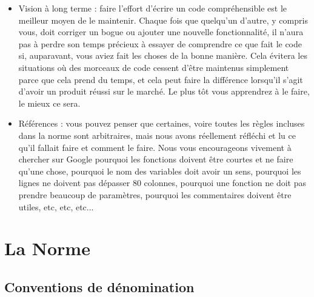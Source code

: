 \documentclass{42-fr}
\begin{document}
\begin{itemize}
    \item Vision à long terme : faire l'effort d'écrire un code compréhensible est le meilleur moyen de le maintenir. 
    Chaque fois que quelqu'un d'autre, y compris vous, doit corriger un bogue ou ajouter une nouvelle fonctionnalité, il n'aura pas à perdre son temps précieux à essayer de comprendre ce que fait le code si, auparavant, vous aviez fait les choses de la bonne manière. Cela évitera les situations où des morceaux de code cessent d'être maintenus simplement parce que cela prend du temps, et cela peut faire la différence lorsqu'il s'agit d'avoir un produit réussi sur le marché. 
    Le plus tôt vous apprendrez à le faire, le mieux ce sera.

    \item Références : vous pouvez penser que certaines, voire toutes les règles incluses dans la norme sont arbitraires, 
    mais nous avons réellement réfléchi et lu ce qu'il fallait faire et comment le faire.
    Nous vous encourageons vivement à chercher sur Google pourquoi les fonctions doivent être courtes et ne faire qu'une chose, 
    pourquoi le nom des variables doit avoir un sens, pourquoi les lignes ne doivent pas dépasser 80 colonnes, pourquoi une fonction ne doit pas prendre beaucoup de paramètres, 
    pourquoi les commentaires doivent être utiles, etc, etc, etc...

    \end{itemize}


\newpage

\chapter{La Norme}


    \section{Conventions de dénomination}
\end{document}
